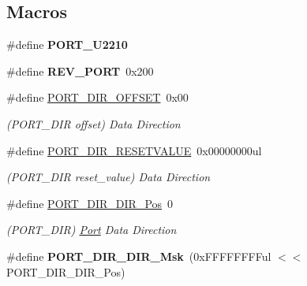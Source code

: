 \subsection*{Macros}
\begin{DoxyCompactItemize}
\item 
\hypertarget{group___s_a_m_l21___p_o_r_t_ga5f5568d546a890f14a2dfa54f417a233}{}\#define {\bfseries P\+O\+R\+T\+\_\+\+U2210}\label{group___s_a_m_l21___p_o_r_t_ga5f5568d546a890f14a2dfa54f417a233}

\item 
\hypertarget{group___s_a_m_l21___p_o_r_t_ga48cafc8c658dd3e36eb503cd8069ff00}{}\#define {\bfseries R\+E\+V\+\_\+\+P\+O\+R\+T}~0x200\label{group___s_a_m_l21___p_o_r_t_ga48cafc8c658dd3e36eb503cd8069ff00}

\item 
\hypertarget{group___s_a_m_l21___p_o_r_t_gae80e64be75702d9047a0150d9c6eafb1}{}\#define \hyperlink{group___s_a_m_l21___p_o_r_t_gae80e64be75702d9047a0150d9c6eafb1}{P\+O\+R\+T\+\_\+\+D\+I\+R\+\_\+\+O\+F\+F\+S\+E\+T}~0x00\label{group___s_a_m_l21___p_o_r_t_gae80e64be75702d9047a0150d9c6eafb1}

\begin{DoxyCompactList}\small\item\em (P\+O\+R\+T\+\_\+\+D\+I\+R offset) Data Direction \end{DoxyCompactList}\item 
\hypertarget{group___s_a_m_l21___p_o_r_t_ga63e44bc52961c08e11fd93c736cdf35c}{}\#define \hyperlink{group___s_a_m_l21___p_o_r_t_ga63e44bc52961c08e11fd93c736cdf35c}{P\+O\+R\+T\+\_\+\+D\+I\+R\+\_\+\+R\+E\+S\+E\+T\+V\+A\+L\+U\+E}~0x00000000ul\label{group___s_a_m_l21___p_o_r_t_ga63e44bc52961c08e11fd93c736cdf35c}

\begin{DoxyCompactList}\small\item\em (P\+O\+R\+T\+\_\+\+D\+I\+R reset\+\_\+value) Data Direction \end{DoxyCompactList}\item 
\hypertarget{group___s_a_m_l21___p_o_r_t_ga24c8369138b85d0fa6b7acdf9f8c8734}{}\#define \hyperlink{group___s_a_m_l21___p_o_r_t_ga24c8369138b85d0fa6b7acdf9f8c8734}{P\+O\+R\+T\+\_\+\+D\+I\+R\+\_\+\+D\+I\+R\+\_\+\+Pos}~0\label{group___s_a_m_l21___p_o_r_t_ga24c8369138b85d0fa6b7acdf9f8c8734}

\begin{DoxyCompactList}\small\item\em (P\+O\+R\+T\+\_\+\+D\+I\+R) \hyperlink{struct_port}{Port} Data Direction \end{DoxyCompactList}\item 
\hypertarget{group___s_a_m_l21___p_o_r_t_ga37edf1972fbe60184737440da12c0a7f}{}\#define {\bfseries P\+O\+R\+T\+\_\+\+D\+I\+R\+\_\+\+D\+I\+R\+\_\+\+Msk}~(0x\+F\+F\+F\+F\+F\+F\+F\+Ful $<$$<$ P\+O\+R\+T\+\_\+\+D\+I\+R\+\_\+\+D\+I\+R\+\_\+\+Pos)\label{group___s_a_m_l21___p_o_r_t_ga37edf1972fbe60184737440da12c0a7f}


\end{DoxyCompactItemize}
